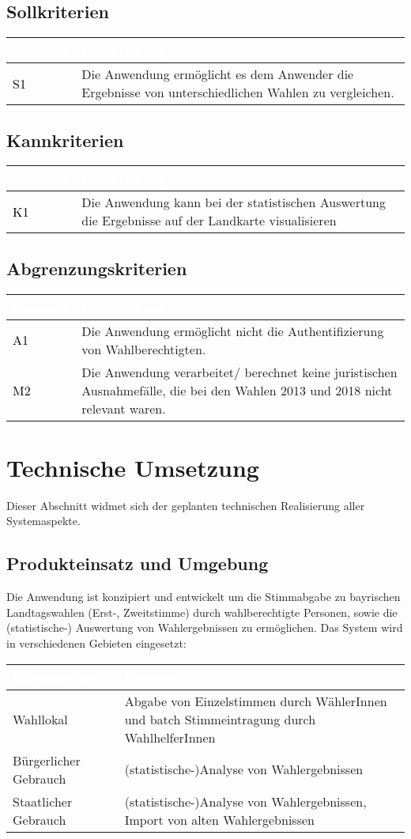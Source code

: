 \documentclass[a4paper,12pt]{article}
\newcommand\addrow[2]{\textcolor{black}{#1} &#2\\ \hline}
\newcommand\addheading[2]{\rowcolor{TUMBlue}\textcolor{white}{#1} & \textcolor{white}{#2}\\ \hline}
\newcommand\tabularhead{\begin{tabular}{|b|p{13cm}|}
\hline
}
\newenvironment{usecase}{\tabularhead}
{\hline\end{tabular}}
\begin{document}
\subsection{Sollkriterien}
\begin{usecase}
	\addheading{Nummer}{Beschreibung} 
	\addrow{S1}{Die Anwendung ermöglicht es dem Anwender die Ergebnisse von unterschiedlichen Wahlen zu vergleichen.}
\end{usecase}
\subsection{Kannkriterien}
\begin{usecase}
	\addheading{Nummer}{Beschreibung} 
	\addrow{K1}{Die Anwendung kann bei der statistischen Auswertung die Ergebnisse auf der Landkarte visualisieren}
\end{usecase}

\subsection{Abgrenzungskriterien}
\begin{usecase}
	\addheading{Nummer}{Beschreibung} 
	\addrow{A1}{Die Anwendung ermöglicht nicht die Authentifizierung von Wahlberechtigten.}
	\addrow{M2}{Die Anwendung verarbeitet/ berechnet keine juristischen Ausnahmefälle, die bei den Wahlen 2013 und 2018 nicht relevant waren.}
	
\end{usecase}


\section{Technische Umsetzung}
Dieser Abschnitt widmet sich der geplanten technischen Realisierung
aller Systemaspekte.

\subsection{Produkteinsatz und Umgebung}
Die Anwendung ist konzipiert und entwickelt um die Stimmabgabe 
zu bayrischen Landtagswahlen (Erst-, Zweitstimme) durch wahlberechtigte
Personen, sowie die (statistische-) Auswertung von Wahlergebnissen zu ermöglichen. 
%
Das System wird in verschiedenen Gebieten eingesetzt:

\begin{center}
\begin{tabular}{|m{5cm}|m{10cm}|}
	\hline
  \rowcolor{TUMBlue} \textcolor{white}{\textbf{Einsatzgebiet}} & \textcolor{white}{\textbf{Prozesse}} \\
  \hline
  Wahllokal & Abgabe von Einzelstimmen durch WählerInnen und batch Stimmeintragung durch WahlhelferInnen \\
	\hline
  Bürgerlicher Gebrauch & (statistische-)Analyse von Wahlergebnissen \\
  \hline
  Staatlicher Gebrauch & (statistische-)Analyse von Wahlergebnissen, Import von alten Wahlergebnissen \\
	\hline
\end{tabular}
\end{center}
\end{document}
